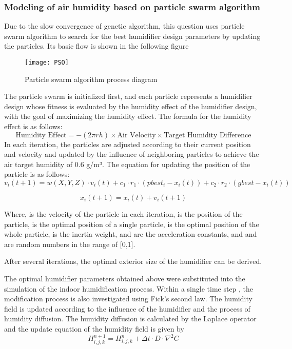 \documentclass{apmcmthesis}
\begin{document}
\subsubsection{Modeling of air humidity based on particle swarm algorithm}
Due to the slow convergence of genetic algorithm, this question uses particle swarm algorithm to search for the best humidifier design parameters by updating the particles. Its basic flow is shown in the following figure
\begin{figure}[H]
	\centering
	\texttt{[image: PSO]}%
	\caption{Particle swarm algorithm process diagram} %
\end{figure}
The particle swarm is initialized first, and each particle represents a humidifier design whose fitness is evaluated by the humidity effect of the humidifier design, with the goal of maximizing the humidity effect.
The formula for the humidity effect is as follows:
\begin{equation}
	\text{Humidity Effect} = -(2\pi rh) \times \text{Air Velocity} \times \text{Target Humidity Difference}
\end{equation}
In each iteration, the particles are adjusted according to their current position and velocity and updated by the influence of neighboring particles to achieve the air target humidity of 0.6 g/m³. The equation for updating the position of the particle is as follows:
\begin{equation}
	v_i(t+1) = w(X, Y, Z) \cdot v_i(t) + c_1 \cdot r_1 \cdot (pbest_i - x_i(t)) + c_2 \cdot r_2 \cdot (gbest - x_i(t))
\end{equation}

\begin{equation}
	x_i(t+1) = x_i(t) + v_i(t+1)
\end{equation}

Where, is the velocity of the particle in each iteration, is the position of the particle, is the optimal position of a single particle, is the optimal position of the whole particle, is the inertia weight, and are the acceleration constants, and and are random numbers in the range of [0,1].

After several iterations, the optimal exterior size of the humidifier can be derived.

The optimal humidifier parameters obtained above were substituted into the simulation of the indoor humidification process. Within a single time step , the modification process is also investigated using Fick's second law. The humidity field is updated according to the influence of the humidifier and the process of humidity diffusion. The humidity diffusion is calculated by the Laplace operator and the update equation of the humidity field is given by
\begin{equation}
	H_{i,j,k}^{n+1} = H_{i,j,k}^{n} + \Delta t \cdot D \cdot \nabla^2 C
\end{equation}
\end{document}
